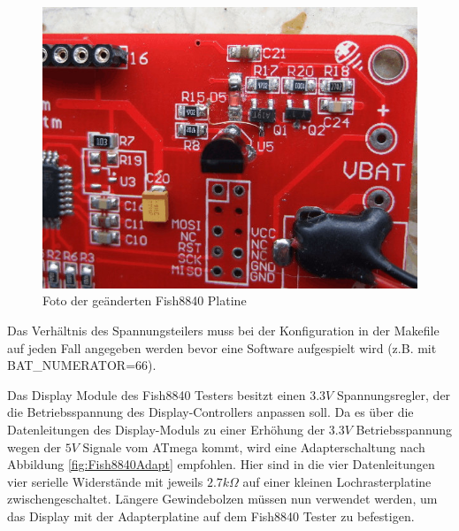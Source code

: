 \begin{figure}[H]
\centering
\includegraphics[width=12cm]{../PNG/Fish8840patch.jpg}
\caption{Foto der geänderten Fish8840 Platine}
\label{fig:Fish8840patch}
\end{figure}

Das Verhältnis des Spannungsteilers muss bei der Konfiguration in der Makefile auf jeden Fall angegeben
werden bevor eine Software aufgespielt wird (z.B. mit BAT\_NUMERATOR=66).

Das Display Module des Fish8840 Testers besitzt einen \(3.3V\) Spannungsregler, der die Betriebsspannung
des Display-Controllers anpassen soll.
Da es über die Datenleitungen des Display-Moduls zu einer Erhöhung der \(3.3V\) Betriebsspannung wegen
der \(5V\) Signale vom ATmega kommt,
wird eine Adapterschaltung nach Abbildung \ref{fig:Fish8840Adapt} empfohlen. Hier sind in die vier
Datenleitungen vier serielle Widerstände mit jeweils \(2.7k\Omega\) auf einer kleinen Lochrasterplatine
zwischengeschaltet.
Längere Gewindebolzen müssen nun verwendet werden, um das Display mit der Adapterplatine auf dem
Fish8840 Tester zu befestigen.

